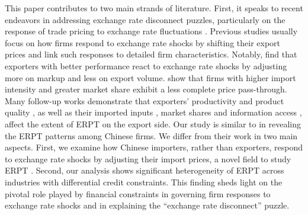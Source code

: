 This paper contributes to two main strands of literature. First, it speaks to recent endeavors in addressing exchange rate disconnect puzzles, particularly on the response of trade pricing to exchange rate fluctuations \citep{campa2005}. Previous studies usually focus on how firms respond to exchange rate shocks by shifting their export prices and link such responses to detailed firm characteristics. Notably, \cite{bmm2012} find that exporters with better performance react to exchange rate shocks by adjusting more on markup and less on export volume. \cite{aik2014} show that firms with higher import intensity and greater market share exhibit a less complete price pass-through. Many follow-up works demonstrate that exporters' productivity \citep{lmx2015} and product quality \citep{chen2016,auer2018}, as well as their imported inputs \citep{wang-yu2021}, market shares \citep{auer2016,devereux2017} and information access \citep{garetto2016}, affect the extent of ERPT on the export side. Our study is similar to \cite{lmx2015} in revealing the ERPT patterns among Chinese firms. We differ from their work in two main aspects. First, we examine how Chinese importers, rather than exporters, respond to exchange rate shocks by adjusting their import prices, a novel field to study ERPT \citep{alviarez2023}. Second, our analysis shows significant heterogeneity of ERPT across industries with differential credit constraints. This finding sheds light on the pivotal role played by financial constraints in governing firm responses to exchange rate shocks and in explaining the ``exchange rate disconnect'' puzzle.   

